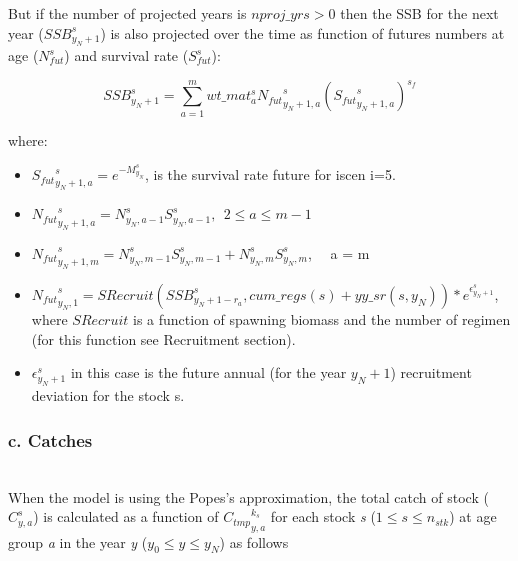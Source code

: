 \documentclass{article}
\begin{document}
But if the number of projected years is $nproj\_yrs>0$ then the SSB for the next year ($SSB^s_{y_N+1}$) is also projected over the time as function of futures numbers at age ($N^s_{fut}$) and survival rate ($S^s_{fut}$): 

\begin{equation}
    SSB^s_{y_N+1}= \sum_{a=1}^m wt\_{mat}^s_a{N_{fut}}^s_{y_N+1,a}({{S_{fut}}^s_{y_N+1,a}})^{s_f}
\end{equation}

where: 

\begin{itemize}

    \item ${S_{fut}}^s_{y_N+1,a} = e^{-M^s_{y_N}}$, is the survival rate future for iscen i=5.

    \item ${N_{fut}}^s_{y_N+1,a} = N^s_{y_N,a-1}S^s_{y_N,a-1}, \ \ 2\leq a \leq m-1$
    
    \item ${N_{fut}}^s_{y_N+1,m} = N^s_{y_N,m-1}S^s_{y_N,m-1}+N^s_{y_N,m}S^s_{y_N,m}$, \ \ a = m 
    
    \item ${N_{fut}}^s_{y_N,1} = SRecruit(SSB^s_{y_N+1-r_a},cum\_regs(s)+yy\_sr(s,y_N))*e^{\epsilon^s_{y_N+1}}$, where $SRecruit$ is a function of  spawning biomass and the number of regimen (for this function see Recruitment section).
    \item $\epsilon^s_{y_N+1}$ in this case is the future annual (for the year $y_N+1$) recruitment deviation for the stock s. 
    
\end{itemize}


\hfill

\subsubsection{c. Catches}\\

When the model is using the Popes's approximation, the total catch of stock ($C^s_{y,a}$) is calculated as a function of ${C_{tmp}}^{k_s}_{y,a}$ for each stock \textit{s} ($1\leq s \leq n_{stk}$) at age group \textit{a} in the year \textit{y} ($y_0 \leq y \leq y_N$) as follows 
\end{document}
